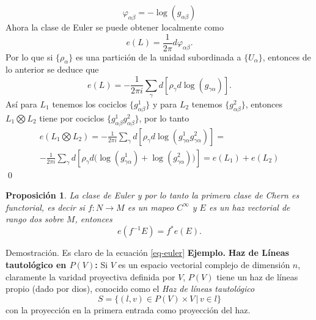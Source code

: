 \documentclass[letterpaper]{article}
\newtheorem{prop}[teorema]{Proposici\'on}
\newcommand{\eje}{{\newline \noindent \sc \textbf{Ejemplo. }}}
\newcommand{\dem}{{\noindent \sc Demostraci\'on. }}
\begin{document}
\[
    \varphi_{\alpha\beta}=-\log(g_{\alpha\beta})
\]
Ahora la clase de Euler se puede obtener localmente como
\[
    e(L)=\frac{1}{2\pi}d\varphi_{\alpha\beta}.
\]
Por lo que si \(\{\rho_{\alpha}\}\) es una partición de la unidad subordinada a \(\{U_{\alpha}\}\), entonces de lo anterior se deduce que
\begin{equation}\label{eq-euler}
    e(L)=-\frac{1}{2\pi i}\sum_{\gamma}d[\rho_{\gamma}d\log(g_{\gamma\alpha})].
\end{equation}
Así para \(L_1\) tenemos los cociclos \(\{g^{1}_{\alpha\beta}\}\) y para \(L_2\) tenemos \(\{g^{2}_{\alpha\beta}\}\), entonces \(L_1\bigotimes L_2\) tiene por cociclos \(\{g^{1}_{\alpha\beta}g^{2}_{\alpha\beta}\}\), por lo tanto
\begin{align*}
    e(L_1\bigotimes L_2)=-\frac{1}{2\pi i}\sum_{\gamma}d[\rho_{\gamma}d\log(g^{1}_{\gamma\alpha}g^{2}_{\gamma\alpha})]=\\
    -\frac{1}{2\pi i}\sum_{\gamma}d[\rho_{\gamma}d\big(\log(g^{1}_{\gamma\alpha})+\log(g^{2}_{\gamma\alpha})\big)]=e(L_1)+e(L_2)
\end{align*}
\qed
\begin{prop}
La clase de Euler y por lo tanto la primera clase de Chern es functorial, es decir si $f:N\rightarrow M$ es un mapeo $C^{\infty}$ y $E$ es un haz vectorial de rango dos sobre $M$, entonces
\[
    e(f^{-1}E)=f^{*}e(E).
\]
\end{prop}
\dem Es claro de la ecuación \ref{eq-euler}
\eje \textbf{Haz de Líneas tautológico en \(P(V)\):} Si \(V\) es un espacio vectorial complejo de dimensión \(n\), claramente la varidad proyectiva definida por \(V\), \(P(V)\) tiene un haz de líneas propio (dado por dios), conocido como el \emph{Haz de líneas tautológico}
\[
    S=\{(l,v)\in P(V)\times V \,|\, v\in l \}
\]
con la proyección en la primera entrada como proyección del haz.
\end{document}
